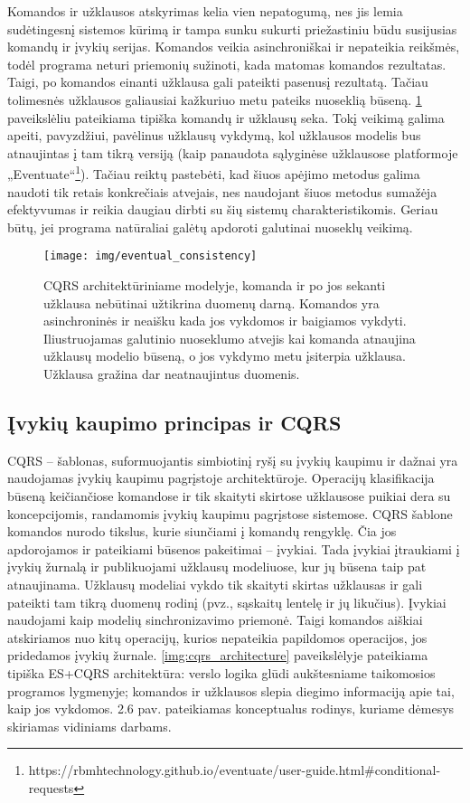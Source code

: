 Komandos ir užklausos atskyrimas kelia vien nepatogumą, nes jis lemia sudėtingesnį sistemos kūrimą ir tampa sunku sukurti priežastiniu būdu susijusias komandų ir įvykių serijas. Komandos veikia asinchroniškai ir nepateikia reikšmės, todėl programa neturi priemonių sužinoti, kada matomas komandos rezultatas. Taigi, po komandos einanti užklausa gali pateikti pasenusį rezultatą. Tačiau tolimesnės užklausos galiausiai kažkuriuo metu pateiks nuoseklią būseną. \ref{img:eventual_consistency} paveikslėliu pateikiama tipiška komandų ir užklausų seka. Tokį veikimą galima apeiti, pavyzdžiui, pavėlinus užklausų vykdymą, kol užklausos modelis bus atnaujintas į tam tikrą versiją (kaip panaudota sąlyginėse užklausose platformoje „Eventuate“\footnote{https://rbmhtechnology.github.io/eventuate/user-guide.html\#conditional-requests}). Tačiau reiktų pastebėti, kad šiuos apėjimo metodus galima naudoti tik retais konkrečiais atvejais, nes naudojant šiuos metodus sumažėja efektyvumas ir reikia daugiau dirbti su šių sistemų charakteristikomis. Geriau būtų, jei programa natūraliai galėtų apdoroti galutinai nuoseklų veikimą.

\begin{figure}[H]
    \centering
    \texttt{[image: img/eventual\_consistency]}
    \caption{CQRS architektūriniame modelyje, komanda ir po jos sekanti užklausa nebūtinai užtikrina duomenų darną. Komandos yra asinchroninės ir neaišku kada jos vykdomos ir baigiamos vykdyti. Iliustruojamas galutinio nuoseklumo atvejis kai komanda atnaujina užklausų modelio būseną, o jos vykdymo metu įsiterpia užklausa. Užklausa gražina dar neatnaujintus duomenis.}
    \label{img:eventual_consistency}
\end{figure}

\subsection{Įvykių kaupimo principas ir CQRS}

CQRS – šablonas, suformuojantis simbiotinį ryšį su įvykių kaupimu ir dažnai yra naudojamas įvykių kaupimu pagrįstoje architektūroje. Operacijų klasifikacija būseną keičiančiose komandose ir tik skaityti skirtose užklausose puikiai dera su koncepcijomis, randamomis įvykių kaupimu pagrįstose sistemose. CQRS šablone komandos nurodo tikslus, kurie siunčiami į komandų rengyklę. Čia jos apdorojamos ir pateikiami būsenos pakeitimai – įvykiai. Tada įvykiai įtraukiami į įvykių žurnalą ir publikuojami užklausų modeliuose, kur jų būsena taip pat atnaujinama. Užklausų modeliai vykdo tik skaityti skirtas užklausas ir gali pateikti tam tikrą duomenų rodinį (pvz., sąskaitų lentelę ir jų likučius). Įvykiai naudojami kaip modelių sinchronizavimo priemonė. Taigi komandos aiškiai atskiriamos nuo kitų operacijų, kurios nepateikia papildomos operacijos, jos pridedamos įvykių žurnale. \ref{img:cqrs_architecture} paveikslėlyje pateikiama tipiška ES+CQRS architektūra: verslo logika glūdi aukštesniame taikomosios programos lygmenyje; komandos ir užklausos slepia diegimo informaciją apie tai, kaip jos vykdomos. 2.6 pav. pateikiamas konceptualus rodinys, kuriame dėmesys skiriamas vidiniams darbams.

